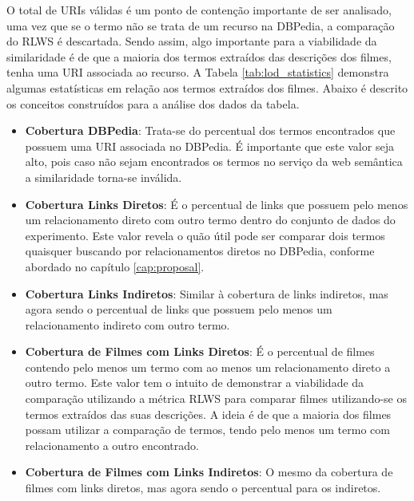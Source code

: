 O total de URIs válidas é um ponto de contenção importante de ser analisado, uma vez que se o termo não se trata de um recurso na DBPedia, a comparação do \ac{RLWS} é descartada. Sendo assim, algo importante para a viabilidade da similaridade é de que a maioria dos termos extraídos das descrições dos filmes, tenha uma \ac{URI} associada ao recurso. A Tabela \ref{tab:lod_statistics} demonstra algumas estatísticas em relação aos termos extraídos dos filmes. Abaixo é descrito os conceitos construídos para a análise dos dados da tabela.

\begin{itemize}
	\item{\textbf{Cobertura DBPedia}: Trata-se do percentual dos termos encontrados que possuem uma \ac{URI} associada no DBPedia. É importante que este valor seja alto, pois caso não sejam encontrados os termos no serviço da web semântica a similaridade torna-se inválida.}
	
	\item{\textbf{Cobertura Links Diretos}: É o percentual de links que possuem pelo menos um relacionamento direto com outro termo dentro do conjunto de dados do experimento. Este valor revela o quão útil pode ser comparar dois termos quaisquer buscando por relacionamentos diretos no DBPedia, conforme abordado no capítulo \ref{cap:proposal}.}
	
	\item{\textbf{Cobertura Links Indiretos}: Similar à cobertura de links indiretos, mas agora sendo o percentual de links que possuem pelo menos um relacionamento indireto com outro termo.}
	
	\item{\textbf{Cobertura de Filmes com Links Diretos}: É o percentual de filmes contendo pelo menos um termo com ao menos um relacionamento direto a outro termo. Este valor tem o intuito de demonstrar a viabilidade da comparação utilizando a métrica \ac{RLWS} para comparar filmes utilizando-se os termos extraídos das suas descrições. A ideia é de que a maioria dos filmes possam utilizar a comparação de termos, tendo pelo menos um termo com relacionamento a outro encontrado.}
	
	\item{\textbf{Cobertura de Filmes com Links Indiretos}: O mesmo da cobertura de filmes com links diretos, mas agora sendo o percentual para os indiretos.}
\end{itemize}

